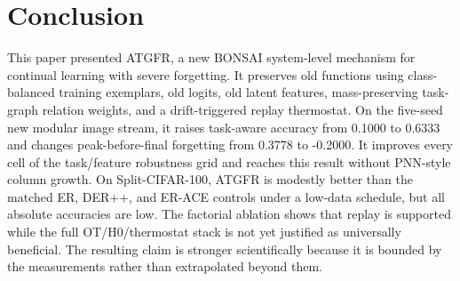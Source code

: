 \documentclass[conference]{IEEEtran}
\newcommand{\ATGFR}{\textsc{ATGFR}}
\begin{document}
\section{Conclusion}

This paper presented \ATGFR{}, a new BONSAI system-level mechanism for
continual learning with severe forgetting. It preserves old functions using
class-balanced training exemplars, old logits, old latent features,
mass-preserving task-graph relation weights, and a drift-triggered replay
thermostat. On the five-seed new modular image stream, it raises task-aware
accuracy from 0.1000 to 0.6333 and changes peak-before-final forgetting from
0.3778 to -0.2000. It improves every cell of the task/feature robustness grid
and reaches this result without PNN-style column growth. On Split-CIFAR-100,
ATGFR is modestly better than the matched ER, DER++, and ER-ACE controls under
a low-data schedule, but all absolute accuracies are low. The factorial
ablation shows that replay is supported while the full OT/H0/thermostat stack
is not yet justified as universally beneficial. The resulting claim is
stronger scientifically because it is bounded by the measurements rather
than extrapolated beyond them.



\end{document}
